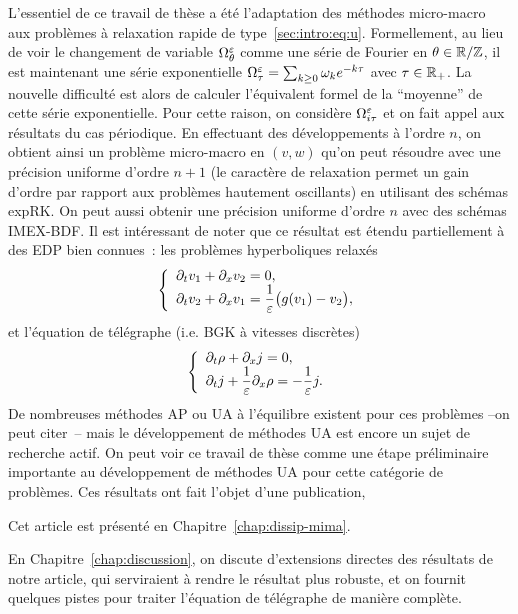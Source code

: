 L'essentiel de ce travail de thèse a été l'adaptation des méthodes micro-macro aux problèmes à relaxation rapide de type~\eqref{sec:intro:eq:u}. Formellement, au lieu de voir le changement de variable $\Omega^{\varepsilon}_\theta$ comme une série de Fourier en $\theta \in \mathbb{R}/\mathbb{Z}$, il est maintenant une série exponentielle $\Omega^{\varepsilon}_\tau = \sum_{k \geq 0} \omega_k e^{-k\tau}$ avec $\tau \in \mathbb{R}_+$. La nouvelle difficulté est alors de calculer l'équivalent formel de la \enquote{moyenne} de cette série exponentielle. Pour cette raison, on considère $\Omega^{\varepsilon}_{i\tau}$ et on fait appel aux résultats du cas périodique. En effectuant des développements à l'ordre $n$, on obtient ainsi un problème micro-macro en $(v,w)$ qu'on peut résoudre avec une précision uniforme d'ordre $n+1$ (le caractère de relaxation permet un gain d'ordre par rapport aux problèmes hautement oscillants) en utilisant des schémas expRK. On peut aussi obtenir une précision uniforme d'ordre $n$ avec des schémas IMEX-BDF. Il est intéressant de noter que ce résultat est étendu partiellement à des EDP bien connues~: les problèmes hyperboliques relaxés
\begin{equation*}
    \left\{ \begin{array}{l} \displaystyle
    \partial_t v_1 + \partial_x v_2 = 0 , \\ \displaystyle
    \partial_t v_2 + \partial_x v_1 = \frac{1}{\varepsilon} \big( g(v_1) - v_2 \big) ,
    \end{array} \right .
\end{equation*}
et l'équation de télégraphe (i.e. BGK à vitesses discrètes)
\begin{equation*}
    \left\{ \begin{array}{l} \displaystyle
    \partial_t \rho + \partial_x j = 0, \\ \displaystyle
    \partial_t j + \frac{1}{\varepsilon}\partial_x \rho = -\frac{1}{\varepsilon} j .
\end{array} \right .
\end{equation*}
De nombreuses méthodes AP ou UA à l'équilibre existent pour ces problèmes --on peut citer~\cite{jin.1999.efficient,lemou.2008.new,dimarco.2011.exponential,dimarco.2017.implicit,boscarino.2017.unified,albi.2020.implicit}-- mais le développement de méthodes UA est encore un sujet de recherche actif. On peut voir ce travail de thèse comme une étape préliminaire importante au développement de méthodes UA pour cette catégorie de problèmes. Ces résultats ont fait l'objet d'une publication, 
\begin{center}\begin{minipage}{.75\textwidth}
    \noindent
\end{minipage}\end{center}
Cet article est présenté en Chapitre~\ref{chap:dissip-mima}. 

En Chapitre~\ref{chap:discussion}, on discute d'extensions directes des résultats de notre article, qui serviraient à rendre le résultat plus robuste, et on fournit quelques pistes pour traiter l'équation de télégraphe de manière complète. 